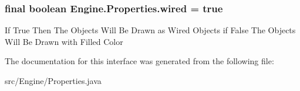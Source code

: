\subsubsection[{wired}]{\setlength{\rightskip}{0pt plus 5cm}final boolean {\bf Engine.Properties.wired} = true\hspace{0.3cm}{\ttfamily  [static]}}\label{interface_engine_1_1_properties_a974c223ea8ba285c7ffe2a4c89e55652}
If True Then The Objects Will Be Drawn as Wired Objects if False The Objects Will Be Drawn with Filled Color 

The documentation for this interface was generated from the following file:\begin{DoxyCompactItemize}
\item 
src/Engine/Properties.java\end{DoxyCompactItemize}
